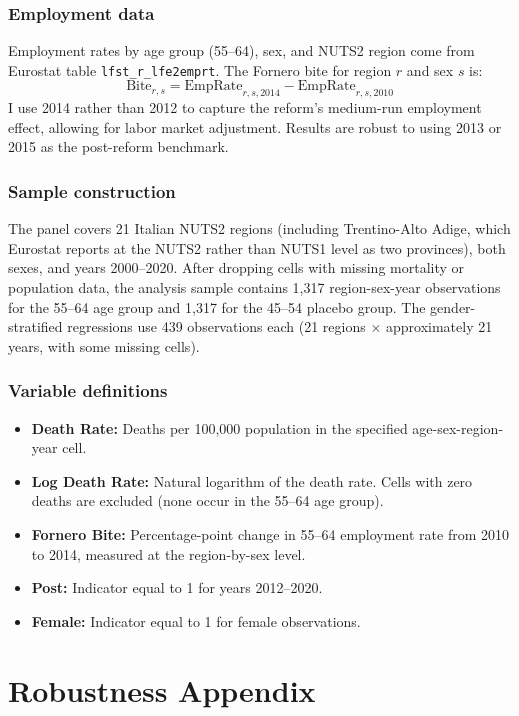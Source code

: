 \documentclass[12pt]{article}
\begin{document}
\subsubsection*{Employment data} Employment rates by age group (55--64), sex, and NUTS2 region come from Eurostat table \texttt{lfst\_r\_lfe2emprt}. The Fornero bite for region $r$ and sex $s$ is:
\[
\text{Bite}_{r,s} = \text{EmpRate}_{r,s,2014} - \text{EmpRate}_{r,s,2010}
\]
I use 2014 rather than 2012 to capture the reform's medium-run employment effect, allowing for labor market adjustment. Results are robust to using 2013 or 2015 as the post-reform benchmark.

\subsubsection*{Sample construction} The panel covers 21 Italian NUTS2 regions (including Trentino-Alto Adige, which Eurostat reports at the NUTS2 rather than NUTS1 level as two provinces), both sexes, and years 2000--2020. After dropping cells with missing mortality or population data, the analysis sample contains 1,317 region-sex-year observations for the 55--64 age group and 1,317 for the 45--54 placebo group. The gender-stratified regressions use 439 observations each (21 regions $\times$ approximately 21 years, with some missing cells).

\subsubsection*{Variable definitions}
\begin{itemize}
    \item \textbf{Death Rate:} Deaths per 100,000 population in the specified age-sex-region-year cell.
    \item \textbf{Log Death Rate:} Natural logarithm of the death rate. Cells with zero deaths are excluded (none occur in the 55--64 age group).
    \item \textbf{Fornero Bite:} Percentage-point change in 55--64 employment rate from 2010 to 2014, measured at the region-by-sex level.
    \item \textbf{Post:} Indicator equal to 1 for years 2012--2020.
    \item \textbf{Female:} Indicator equal to 1 for female observations.
\end{itemize}

\section{Robustness Appendix}
\label{sec:robustness_appendix}
\end{document}

